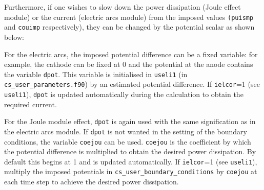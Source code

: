 {{Furthermore, if one wishes to slow down the power dissipation (Joule
effect module) or the current (electric arcs module) from the imposed values
\texttt{(puismp} and \texttt{couimp} respectively),
 they can be changed by the potential scalar as shown below:

\begin{list}{-}{}
\item For the electric arcs, the imposed potential difference can be a fixed variable:
 for example, the cathode can be fixed at 0 and the potential at the anode
 contains the variable \texttt{dpot}. This variable is initialised in
\texttt{useli1} (in \texttt{cs\_user\_parameters.f90})
 by an estimated potential difference. If \texttt{ielcor}=1 (see
 \texttt{useli1}), \texttt{dpot} is updated automatically during the
 calculation to obtain the required current.
\item For the Joule module effect, \texttt{dpot} is again used with the same
 signification as in the electric arcs module. If \texttt{dpot} is not wanted
 in the setting of the boundary conditions, the variable \texttt{coejou} can be
 used. \texttt{coejou} is the coefficient by which the potential difference is
 multiplied to obtain the desired power dissipation. By default this begins at
 1 and is updated automatically. If \texttt{ielcor}=1 (see \texttt
{useli1}), multiply the imposed potentials in
\texttt{cs\_user\_boundary\_conditions} by \texttt{coejou} at each time step to
achieve the desired power dissipation.
 \end{list}

}}
